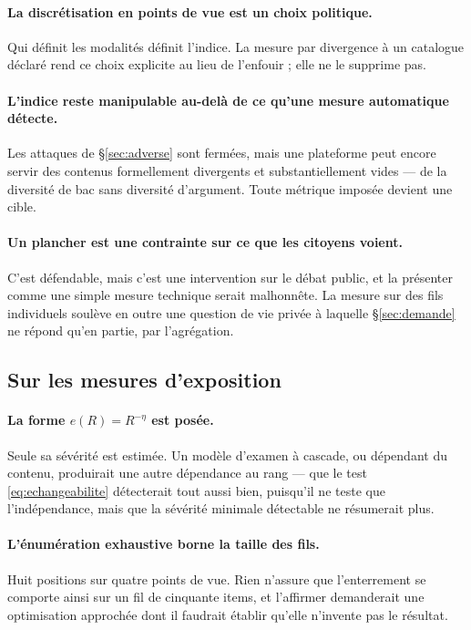 \documentclass[11pt,a4paper]{article}
\begin{document}
\paragraph{La discrétisation en points de vue est un choix politique.} Qui définit les
modalités définit l'indice. La mesure par divergence à un catalogue déclaré rend ce choix
explicite au lieu de l'enfouir ; elle ne le supprime pas.

\paragraph{L'indice reste manipulable au-delà de ce qu'une mesure automatique détecte.} Les
attaques de \S\ref{sec:adverse} sont fermées, mais une plateforme peut encore servir des
contenus formellement divergents et substantiellement vides --- de la diversité de bac sans
diversité d'argument. Toute métrique imposée devient une cible.

\paragraph{Un plancher est une contrainte sur ce que les citoyens voient.} C'est défendable,
mais c'est une intervention sur le débat public, et la présenter comme une simple mesure
technique serait malhonnête. La mesure sur des fils individuels soulève en outre une question
de vie privée à laquelle \S\ref{sec:demande} ne répond qu'en partie, par l'agrégation.

\subsection{Sur les mesures d'exposition}

\paragraph{La forme $e(R) = R^{-\eta}$ est posée.} Seule sa sévérité est estimée. Un modèle
d'examen à cascade, ou dépendant du contenu, produirait une autre dépendance au rang --- que
le test \eqref{eq:echangeabilite} détecterait tout aussi bien, puisqu'il ne teste que
l'indépendance, mais que la sévérité minimale détectable ne résumerait plus.

\paragraph{L'énumération exhaustive borne la taille des fils.} Huit positions sur quatre
points de vue. Rien n'assure que l'enterrement se comporte ainsi sur un fil de cinquante
items, et l'affirmer demanderait une optimisation approchée dont il faudrait établir qu'elle
n'invente pas le résultat.
\end{document}
